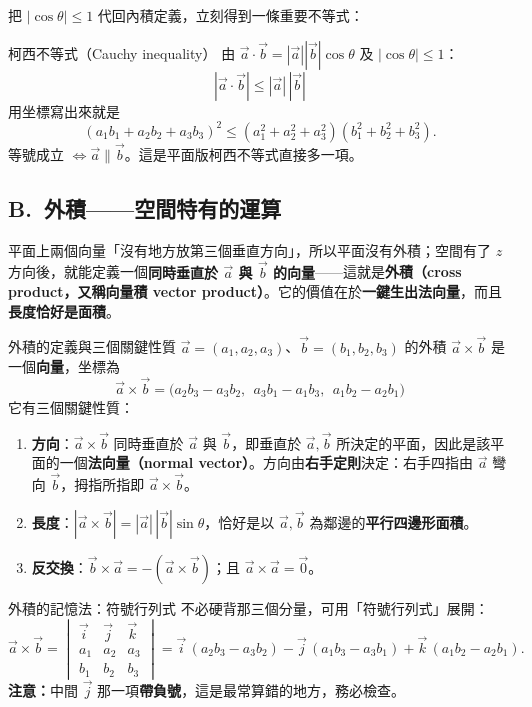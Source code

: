 \documentclass[11pt]{article}
\begin{document}
把 $|\cos\theta|\le 1$ 代回內積定義，立刻得到一條重要不等式：

\begin{補充框}{柯西不等式（Cauchy inequality）}
由 $\vec a\cdot\vec b=|\vec a||\vec b|\cos\theta$ 及 $|\cos\theta|\le 1$：
$$\boxed{\;|\vec a\cdot\vec b|\le|\vec a|\,|\vec b|\;}$$
用坐標寫出來就是
$$(a_1b_1+a_2b_2+a_3b_3)^2\le(a_1^2+a_2^2+a_3^2)(b_1^2+b_2^2+b_3^2).$$
等號成立 $\iff\vec a\parallel\vec b$。這是平面版柯西不等式直接多一項。
\end{補充框}

\subsection*{\sffamily B.\ 外積——空間特有的運算}

平面上兩個向量「沒有地方放第三個垂直方向」，所以平面沒有外積；空間有了 $z$ 方向後，就能定義一個\textbf{同時垂直於 $\vec a$ 與 $\vec b$ 的向量}——這就是\textbf{外積（cross product，又稱向量積 vector product）}。它的價值在於\textbf{一鍵生出法向量}，而且\textbf{長度恰好是面積}。

\begin{補充框}{外積的定義與三個關鍵性質}
$\vec a=(a_1,a_2,a_3)$、$\vec b=(b_1,b_2,b_3)$ 的外積 $\vec a\times\vec b$ 是一個\textbf{向量}，坐標為
$$\boxed{\;\vec a\times\vec b=\bigl(a_2b_3-a_3b_2,\ \ a_3b_1-a_1b_3,\ \ a_1b_2-a_2b_1\bigr)\;}$$
它有三個關鍵性質：
\begin{enumerate}\setlength{\itemsep}{1pt}
\item \textbf{方向}：$\vec a\times\vec b$ 同時垂直於 $\vec a$ 與 $\vec b$，即垂直於 $\vec a,\vec b$ 所決定的平面，因此是該平面的一個\textbf{法向量（normal vector）}。方向由\textbf{右手定則}決定：右手四指由 $\vec a$ 彎向 $\vec b$，拇指所指即 $\vec a\times\vec b$。
\item \textbf{長度}：$|\vec a\times\vec b|=|\vec a|\,|\vec b|\sin\theta$，恰好是以 $\vec a,\vec b$ 為鄰邊的\textbf{平行四邊形面積}。
\item \textbf{反交換}：$\vec b\times\vec a=-(\vec a\times\vec b)$；且 $\vec a\times\vec a=\vec 0$。
\end{enumerate}
\end{補充框}


\begin{補充框}{外積的記憶法：符號行列式}
不必硬背那三個分量，可用「符號行列式」展開：
$$\vec a\times\vec b=\begin{vmatrix}\vec i&\vec j&\vec k\\ a_1&a_2&a_3\\ b_1&b_2&b_3\end{vmatrix}
=\vec i\,(a_2b_3-a_3b_2)-\vec j\,(a_1b_3-a_3b_1)+\vec k\,(a_1b_2-a_2b_1).$$
\textbf{注意：}中間 $\vec j$ 那一項\textbf{帶負號}，這是最常算錯的地方，務必檢查。
\end{補充框}
\end{document}

